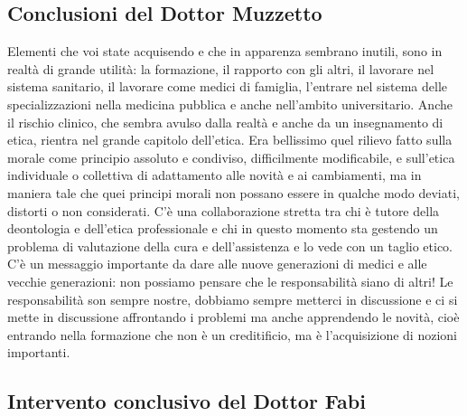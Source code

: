 \subsection{Conclusioni del Dottor Muzzetto}

Elementi che voi state acquisendo e che in apparenza sembrano inutili,
sono in realtà di grande utilità: la formazione, il rapporto con gli
altri, il lavorare nel sistema sanitario, il lavorare come medici di
famiglia, l'entrare nel sistema delle specializzazioni nella medicina
pubblica e anche nell'ambito universitario. Anche il rischio clinico,
che sembra avulso dalla realtà e anche da un insegnamento di etica,
rientra nel grande capitolo dell'etica. Era bellissimo quel rilievo
fatto sulla morale come principio assoluto e condiviso, difficilmente
modificabile, e sull'etica individuale o collettiva di adattamento alle
novità e ai cambiamenti, ma in maniera tale che quei principi morali non
possano essere in qualche modo deviati, distorti o non considerati. C'è
una collaborazione stretta tra chi è tutore della deontologia e
dell'etica professionale e chi in questo momento sta gestendo un
problema di valutazione della cura e dell'assistenza e lo vede con un
taglio etico. C'è un messaggio importante da dare alle nuove generazioni
di medici e alle vecchie generazioni: non possiamo pensare che le
responsabilità siano di altri! Le responsabilità son sempre nostre,
dobbiamo sempre metterci in discussione e ci si mette in discussione
affrontando i problemi ma anche apprendendo le novità, cioè entrando
nella formazione che non è un creditificio, ma è l'acquisizione di
nozioni importanti.

\subsection{Intervento conclusivo del Dottor Fabi}

